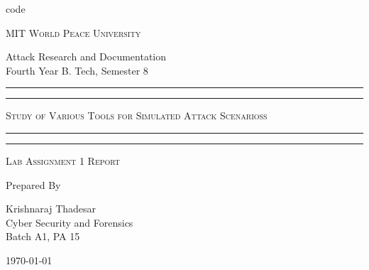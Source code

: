 code \documentclass[11pt]{article}
\begin{document}
\begin{titlepage}
	\centering


	\huge\textsc{
		MIT World Peace University
	}\\

	\vspace{0.75\baselineskip} %

	\LARGE{
		Attack Research and Documentation\\
		Fourth Year B. Tech, Semester 8
	}

	\vfill %


	\rule{\textwidth}{1.6pt}\vspace*{-\baselineskip}\vspace*{2pt}
	\rule{\textwidth}{0.6pt}
	\vspace{0.75\baselineskip} %

	\huge{\textsc{
        Study of Various Tools for Simulated
            Attack Scenarioss
        }} \\

	\vspace{0.5\baselineskip} %
	\rule{\textwidth}{0.6pt}\vspace*{-\baselineskip}\vspace*{2.8pt}
	\rule{\textwidth}{1.6pt}

	\vspace{1\baselineskip} %


	\LARGE\textsc{
		Lab Assignment 1 Report
	} %
	\vfill


	Prepared By \vspace{0.5\baselineskip} %

	\Large{
		Krishnaraj Thadesar \\
		Cyber Security and Forensics\\
        Batch A1, PA 15
	}

	\vspace{0.5\baselineskip} %
	\today

\end{titlepage}
\end{document}
